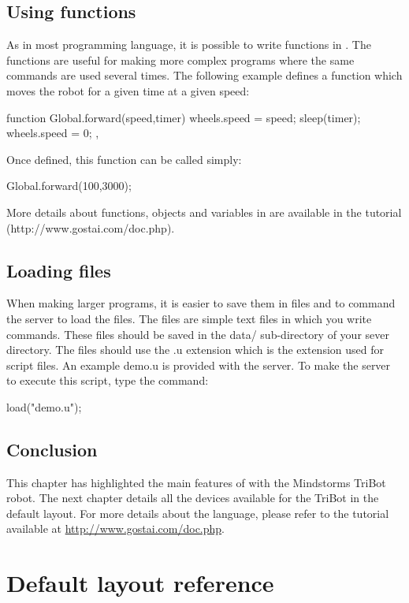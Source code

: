 \subsection{Using functions}
As in most programming language, it is possible to write functions in \urbi. The
functions are useful for making more complex programs where the same commands
are used several times.
The following example defines a function which moves the robot for a given time
at a given speed:
\begin{urbiunchecked}
function Global.forward(speed,timer)
{
  wheels.speed = speed;
  sleep(timer);
  wheels.speed = 0;
},
\end{urbiunchecked}


Once defined, this function can be called simply:
\begin{urbiunchecked}
Global.forward(100,3000);
\end{urbiunchecked}

More details about functions, objects and variables in \urbi are available in
the \urbi tutorial (http://www.gostai.com/doc.php).

\subsection{Loading files}
When making larger \urbi programs, it is easier to save them in files and to
command the server to load the files.
The files are simple text files in which you write \urbi commands. These files
should be saved in the data/ sub-directory of your sever directory. The files
should use the .u extension which is the extension used for \urbi script files.
An example demo.u is provided with the server. To make the \urbi server to
execute this script, type the \urbi command:
\begin{urbiunchecked}
  load("demo.u");
\end{urbiunchecked}


\subsection{Conclusion}
This chapter has highlighted the main features of \urbi with the Mindstorms
TriBot robot. The next chapter details all the devices available for the
TriBot in the default layout. For more details about the \urbi language,
please refer to the \urbi tutorial available at
\url{http://www.gostai.com/doc.php}.


\section{Default layout reference}


